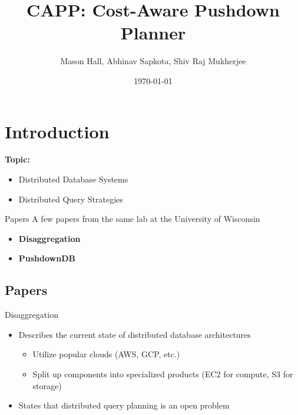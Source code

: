 \documentclass{beamer}
\title{CAPP: Cost-Aware Pushdown Planner}
\author{Mason Hall, Abhinav Sapkota, Shiv Raj Mukherjee}
\institute{University of Cincinnati}
\date{\today}
\begin{document}
\maketitle

\section{Introduction}
\begin{frame}
    \textbf{Topic:}
    \begin{itemize}
        \item Distributed Database Systems \pause
        \item Distributed Query Strategies
    \end{itemize}
\end{frame}

\begin{frame}{Papers}
A few papers from the same lab at the University of Wisconsin \pause
\newline
    \begin{itemize}
        \item \textbf{Disaggregation} \cite{yu2025disaggregation} \pause
        \item \textbf{PushdownDB} \cite{yu2020pushdowndb} \cite{yang2021flexpushdowndb}
    \end{itemize}
\end{frame}

\subsection{Papers}
\begin{frame}{Disaggregation}
    \begin{itemize}
        \item Describes the current state of distributed database architectures \pause
            \begin{itemize}
                \item Utilize popular clouds (AWS, GCP, etc.) \pause
                \item Split up components into specialized products (EC2
                for compute, S3 for storage) \pause
            \end{itemize}
        \item States that distributed query planning is an open problem
    \end{itemize}
\end{frame}
\end{document}
